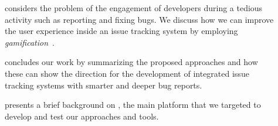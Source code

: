 \begin{description}
  \item[] considers the problem of the engagement of developers during a tedious activity such as reporting and fixing bugs.
  We discuss how we can improve the user experience inside an issue tracking system by employing \emph{gamification}~\cite{DalS2017a}.

  \item[] concludes our work by summarizing the proposed approaches and how these can show the direction for the development of integrated issue tracking systems with smarter and deeper bug reports.

  \item[] presents a brief background on \pha, the main platform that we targeted to develop and test our approaches and tools.

\end{description}
